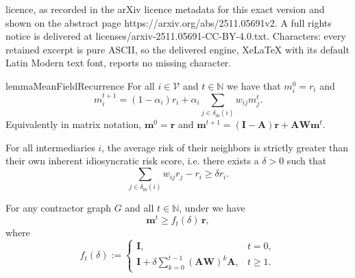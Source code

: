 \documentclass[10pt,a4paper]{amsart}
\newcommand{\A}{\mathbf{A}}
\newcommand{\I}{\mathbf{I}}
\newcommand{\W}{\mathbf{W}}
\newcommand{\din}{\delta_{\text{in}}}
\newcommand{\meanvec}{\mathbf{\mean}}
\newcommand{\mean}{m}
\newcommand{\rvec}{\mathbf{r}}
\begin{document}
licence, as recorded in the arXiv licence metadata for this exact version and shown on the abstract page https://arxiv.org/abs/2511.05691v2. A full rights notice is delivered at licenses/arxiv-2511.05691-CC-BY-4.0.txt. Characters: every retained excerpt is pure ASCII, so the delivered engine, XeLaTeX with its default Latin Modern text font, reports no missing character.
\begin{restatable}{lemma}{MeanFieldRecurrence}
\label{lem:mean_field_recurrence}
For all $i \in \mathcal{V}$ and $t \in \mathbb{N}$ we have that $\mean_i^0 = r_i$ and
\begin{equation}
\label{eq:mean_field_recurrence}
    \mean_i^{t  + 1} = (1 - \alpha_i) r_i + \alpha_i \sum_{j \in \din(i)} w_{ij} \mean_j^{t}.
\end{equation}
Equivalently in matrix notation,  $\meanvec^0 = \rvec$ and \( \meanvec^{t + 1} = (\I - \A) \rvec + \A \W \meanvec^{t}\).
\end{restatable}

\begin{assumption}
\label{ass:strictly_larger_neighbors}
For all intermediaries $i$, the average risk of their neighbors is strictly greater than their own inherent idiosyncratic risk score, i.e. there exists a $\delta > 0$ such that
\[\sum_{j \in \din(i)} w_{ij} r_j - r_i \geq \delta r_i.\]
\end{assumption}

\begin{lemma}
\label{lem:mean_risk_increase}
For any contractor graph $G$ and all $t \in \mathbb{N}$, under  we have
\[
    \meanvec^t \geq f_t(\delta)\,\rvec,
\]
where
\[
    f_t(\delta) :=
    \begin{cases}
        \I, & t=0, \\[6pt]
        \I + \delta \sum_{k=0}^{t-1} (\A\W)^k \A, & t \geq 1.
    \end{cases}
\]
\end{lemma}
\end{document}
